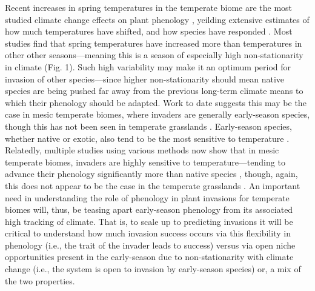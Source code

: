 \documentclass[11pt,a4paper,oneside]{article}
\begin{document}
Recent increases in spring temperatures in the temperate biome \citep[at least partially associated with increased in greenhouse gases, see][]{Trenberth:2007hk} are the most studied climate change effects on plant phenology \citep{Pau:2011wd}, yeilding extensive estimates of how much temperatures have shifted, and how species have responded \citep{Parmesan:2003dm,Root:2003kl,Menzel:2006sq}. Most studies find that spring temperatures have increased more than temperatures in other other seasons---meaning this is a season of especially high non-stationarity in climate (Fig. 1). Such high variability may make it an optimum period for invasion of other species---since higher non-stationarity should mean native species are being pushed far away from the previous long-term climate means to which their phenology should be adapted. Work to date suggests this may be the case in mesic temperate biomes, where invaders are generally early-season species, though this has not been seen in temperate grasslands \citep{wolkovichAmBot2013}. Early-season species, whether native or exotic, also tend to be the most sensitive to temperature \citep{Cook:2012,Wolkovich:2012n}. Relatedly, multiple studies using various methods now show that in mesic temperate biomes, invaders are highly sensitive to temperature---tending to advance their phenology significantly more than native species \citep{Willis:2010al,wolkovichAmBot2013}, though, again, this does not appear to be the case in the temperate grasslands \citep{wolkovichAmBot2013}. An important need in understanding the role of phenology in plant invasions for temperate biomes will, thus, be teasing apart early-season phenology from its associated high tracking of climate. That is, to scale up to predicting invasions it will be critical to understand how much invasion success occurs via this flexibility in phenology (i.e., the trait of the invader leads to success) versus via open niche opportunities present in the early-season due to non-stationarity with climate change (i.e., the system is open to invasion by early-season species) or, a mix of the two properties.\\
\\
\end{document}
